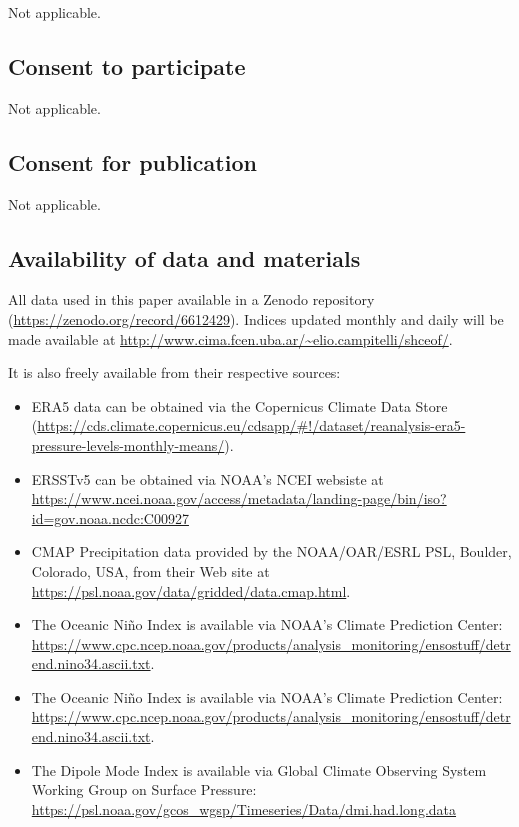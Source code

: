\documentclass[pdflatex,lineno,sn-basic]{sn-jnl}
\theoremstyle{thmstyleone}%
\theoremstyle{thmstyletwo}%
\theoremstyle{thmstylethree}%
\begin{document}
Not applicable.

\hypertarget{consent-to-participate}{%
\subsection*{Consent to participate}\label{consent-to-participate}}

Not applicable.

\hypertarget{consent-for-publication}{%
\subsection*{Consent for publication}\label{consent-for-publication}}

Not applicable.

\hypertarget{availability-of-data-and-materials}{%
\subsection*{Availability of data and materials}\label{availability-of-data-and-materials}}

All data used in this paper available in a Zenodo repository \citep{campitelli2022a} (\url{https://zenodo.org/record/6612429}).
Indices updated monthly and daily will be made available at \url{http://www.cima.fcen.uba.ar/~elio.campitelli/shceof/}.

It is also freely available from their respective sources:

\begin{itemize}
\item
  ERA5 data can be obtained via the Copernicus Climate Data Store (\url{https://cds.climate.copernicus.eu/cdsapp/\#!/dataset/reanalysis-era5-pressure-levels-monthly-means/}).
\item
  ERSSTv5 can be obtained via NOAA's NCEI websiste at \url{https://www.ncei.noaa.gov/access/metadata/landing-page/bin/iso?id=gov.noaa.ncdc:C00927}
\item
  CMAP Precipitation data provided by the NOAA/OAR/ESRL PSL, Boulder, Colorado, USA, from their Web site at \url{https://psl.noaa.gov/data/gridded/data.cmap.html}.
\item
  The Oceanic Niño Index is available via NOAA's Climate Prediction Center: \url{https://www.cpc.ncep.noaa.gov/products/analysis_monitoring/ensostuff/detrend.nino34.ascii.txt}.
\item
  The Oceanic Niño Index is available via NOAA's Climate Prediction Center: \url{https://www.cpc.ncep.noaa.gov/products/analysis_monitoring/ensostuff/detrend.nino34.ascii.txt}.
\item
  The Dipole Mode Index is available via Global Climate Observing System Working Group on Surface Pressure: \url{https://psl.noaa.gov/gcos_wgsp/Timeseries/Data/dmi.had.long.data}
\end{itemize}
\end{document}
